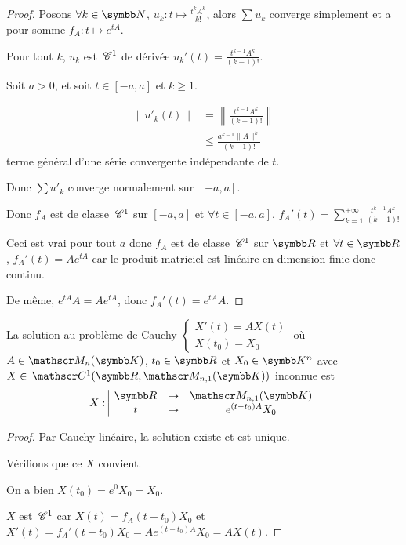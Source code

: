 \begin{proof}
    Posons $\forall k \in \N$, $u_k: t \mapsto \frac{t^k A^k}{k!}$, alors 
    $\sum u_k$ converge simplement et a pour somme $f_A : t \mapsto e^{tA}$.

    Pour tout $k$, $u_k$ est $\,\mathscr C^{1}$ de dérivée $u_k'(t) = \frac{t^{k - 1} A^k}{(k - 1)!}$.

    Soit $a > 0$, et soit $t \in [-a, a]$ et $k \geqslant 1$. 

    \begin{align}
        \| u'_k(t) \| & = \left\| \frac{t^{k - 1} A^k}{(k - 1)!} \right\| \\
        & \leqslant \frac{a^{k - 1} \| A \|^k}{(k - 1)!}
    \end{align}
    terme général d'une série convergente indépendante de $t$. 

    Donc $\sum u'_k$ converge normalement sur $[-a, a]$.

    Donc $f_A$ est de classe $\,\mathscr C^{1}$ sur $[-a, a]$ et $\forall t \in [-a, a]$, $f_A'(t) = \sum_{k = 1}^{+ \infty} \frac{t^{k - 1} A^k}{(k - 1)!}$

    Ceci est vrai pour tout $a$ donc $f_A$ est de classe $\,\mathscr C^{1}$ sur $\R$ et $\forall t \in \R$, 
    $f_A'(t) = A e^{tA}$ car le produit matriciel est linéaire en dimension finie donc continu. 

    De même, $e^{tA} A = A e^{tA}$, donc $f_A'(t) = e^{tA} A$.
\end{proof}

\begin{theoreme}{}{}
    La solution au problème de Cauchy $\begin{cases}
    X'(t) = A X(t) \\
    X(t_0) = X_0
    \end{cases}$ où $A \in \mathscr M_n(\K)$, $t_0 \in \R$ et $X_0 \in \K^n$ avec $X \in \mc 1 (\R, \mathscr M_{n, 1}(\K))$ inconnue
    est $$\fonction{X}{\R}{\mathscr M_{n, 1}(\K)}{t}{e^{(t - t_0) A} X_0}$$
\end{theoreme}

\begin{proof}
    Par Cauchy linéaire, la solution existe et est unique. 

    Vérifions que ce $X$ convient. 

    On a bien $X(t_0) = e^0 X_0 = X_0$.

    $X$ est $\,\mathscr C^{1}$ car $X(t) = f_A(t - t_0) X_0$ et $X'(t) = f_A'(t - t_0) X_0 = A e^{(t - t_0) A} X_0 = A X(t)$.
\end{proof}

